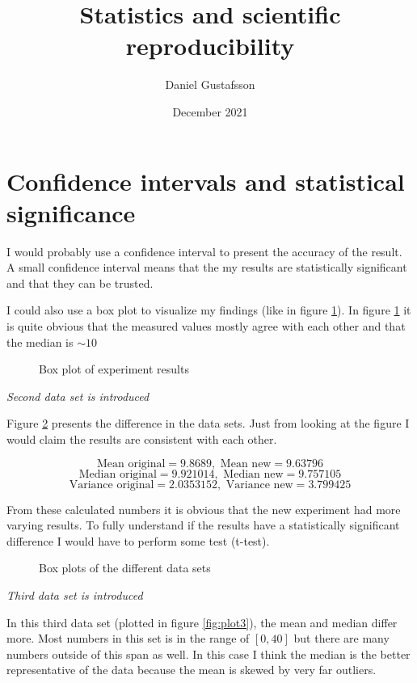 \documentclass[11pt, a4paper]{article}
\title{Statistics and scientific reproducibility}
\author{Daniel Gustafsson}
\date{December 2021}
\begin{document}
\maketitle

\section{Confidence intervals and statistical significance}

I would probably use a confidence interval to present the accuracy 
of the result. A small confidence interval means that the my results
are statistically significant and that they can be trusted. 

I could also use a box plot to visualize my findings (like in figure \ref{fig:plot1}).
In figure \ref{fig:plot1} it is quite obvious that the measured values mostly agree
with each other and that the median is $\sim 10$ 


\begin{figure}[h]
	\centering
	\caption{Box plot of experiment results}
	
	\label{fig:plot1}
\end{figure}

\vspace{4mm}\noindent
\textit{Second data set is introduced}

\vspace{2mm}\noindent
Figure \ref{fig:plot2} presents the difference in the data sets. Just from looking at the
figure I would claim the results are consistent with each other.

\[\text{Mean original} = 9.8689, \text{ Mean new} = 9.63796\]
\[\text{Median original} = 9.921014, \text{ Median new} = 9.757105\]
\[\text{Variance original} = 2.0353152, \text{ Variance new} = 3.799425\]

From these calculated numbers it is obvious that the new experiment had more varying results.
To fully understand if the results have a statistically significant difference I would have to
perform some test (t-test).

\begin{figure}[h]
	\centering
	\caption{Box plots of the different data sets}
	
	\label{fig:plot2}
\end{figure}

\vspace{4mm}\noindent
\textit{Third data set is introduced}

\vspace{2mm}\noindent
In this third data set (plotted in figure \ref{fig:plot3}), the mean and median differ more.
Most numbers in this set is in the range of $[0,40]$ but there are many numbers outside of this span
as well.
In this case I think the median is the better representative of the data because the mean is skewed by
very far outliers.
\end{document}
